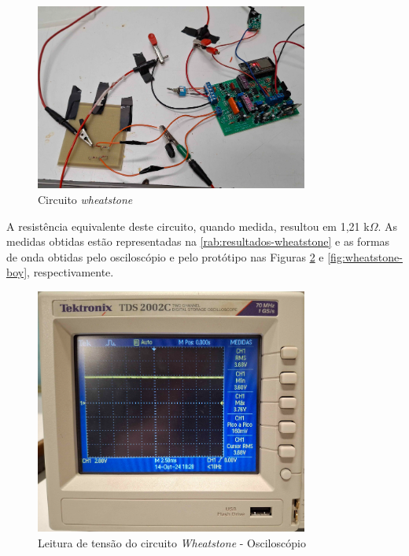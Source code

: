 \begin{figure}[htb!]
    \caption{Circuito \textit{wheatstone}}
    \label{fig:circuito-wheatstone-full}
    \includegraphics[width=0.8\textwidth]{figuras/circuito-wheatstone-full.png}
    \fonte{}
\end{figure}

A resistência equivalente deste circuito, quando medida, resultou em 1,21 k$\Omega$. As medidas obtidas estão representadas na \autoref{rab:resultados-wheatstone} e as formas de onda obtidas pelo osciloscópio e pelo protótipo nas Figuras \ref{fig:wheatstone-osc} e \ref{fig:wheatstone-boy}, respectivamente.

\begin{figure}[htb!]
    \caption{Leitura de tensão do circuito \textit{Wheatstone} - Osciloscópio}
    \label{fig:wheatstone-osc}
    \includegraphics[width=0.8\textwidth]{figuras/wheatstone-osc.png}
    \fonte{}
\end{figure}

